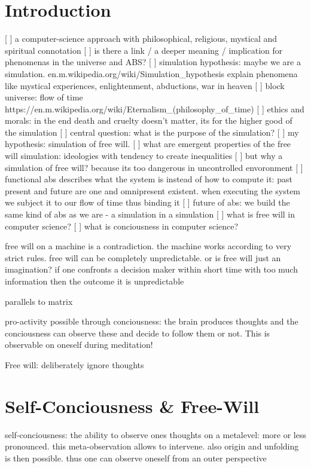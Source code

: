 \documentclass{article}
\begin{document}
\section{Introduction}
[ ] a computer-science approach with philosophical, religious, mystical and spiritual connotation
[ ] is there a link / a deeper meaning / implication for phenomenas in the universe and ABS?
[ ] simulation hypothesis: maybe we are a simulation. en.m.wikipedia.org/wiki/Simulation_hypothesis explain phenomena like mystical experiences, enlightenment, abductions, war in heaven
[ ] block universe: flow of time https://en.m.wikipedia.org/wiki/Eternalism_(philosophy_of_time)
[ ] ethics and morals: in the end death and cruelty doesn't matter, its for the higher good of the simulation
[ ] central question: what is the purpose of the simulation?
[ ] my hypothesis: simulation of free will.
[ ] what are emergent properties of the free will simulation: ideologies with tendency to create inequalities
[ ] but why a simulation of free will? because its too dangerous in uncontrolled envoronment
[ ] functional abs describes what the system is instead of how to compute it: past present and future are one and omnipresent existent. when executing the system we subject it to our flow of time thus binding it
[ ] future of abs: we build the same kind of abs as we are - a simulation in a simulation 
[ ] what is free will in computer science?
[ ] what is conciousness in computer science?


free will on a machine is a contradiction. the machine works according to very strict rules. free will can be completely unpredictable. or is free will just an imagination? if one confronts a decision maker within short time with too much information then the outcome it is unpredictable 

parallels to matrix

pro-activity possible through conciousness: the brain produces thoughts and the conciousness can observe these and decide to follow them or not. This is observable on oneself during meditation!

Free will: deliberately ignore thoughts

\section{Self-Conciousness \& Free-Will}
self-conciousness: the ability to observe ones thoughts on a metalevel: more or less pronounced. this meta-observation allows to intervene. also origin and unfolding is then possible. thus one can observe oneself from an outer perspective \\
\end{document}
